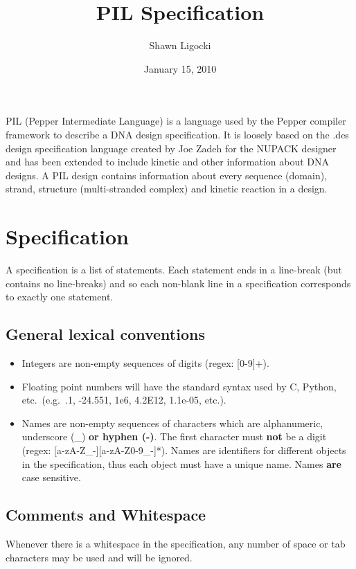 \documentclass{article}
\begin{document}
\title{PIL Specification}
\author{Shawn Ligocki}
\date{January 15, 2010}
\maketitle

PIL (Pepper Intermediate Language) is a language used by the Pepper
compiler framework to describe a DNA design specification. It is loosely
based on the .des design specification language created by Joe Zadeh
for the NUPACK designer and has been extended to include kinetic and
other information about DNA designs. A PIL design contains information
about every sequence (domain), strand, structure (multi-stranded complex)
and kinetic reaction in a design.


\section{Specification}

A specification is a list of statements. Each statement ends in a
line-break (but contains no line-breaks) and so each non-blank line
in a specification corresponds to exactly one statement.


\subsection{General lexical conventions}
\begin{itemize}
\item Integers are non-empty sequences of digits (regex: [0-9]+).

\item Floating point numbers will have the standard syntax used by C, Python, etc.\ (e.g.\ .1, -24.551, 1e6, 4.2E12, 1.1e-05, etc.).

\item Names are non-empty sequences of characters which are alphanumeric,
underscore (\_) \textbf{or hyphen (-)}. The first character must \textbf{not}
be a digit (regex: [a-zA-Z\_-][a-zA-Z0-9\_-]*). Names are
identifiers for different objects in the specification, thus each
object must have a unique name. Names \textbf{are}\textbf{\emph{ }}case
sensitive.
\end{itemize}


\subsection{Comments and Whitespace}

Whenever there is a whitespace in the specification, any number of
space or tab characters may be used and will be ignored.
\end{document}
